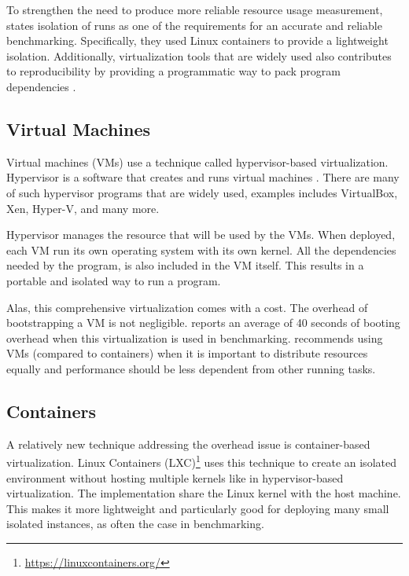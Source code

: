 To strengthen the need to produce more reliable resource usage measurement, \citet{beyerReliableBenchmarkingRequirements2019} states isolation of runs as one of the requirements for an accurate and reliable benchmarking.
Specifically, they used Linux containers to provide a lightweight isolation.
Additionally, virtualization tools that are widely used also contributes to reproducibility by providing a programmatic way to pack program dependencies \citep{boettigerIntroductionDockerReproducible2015,kordonBenchKitToolMassive2014}.

\subsection{Virtual Machines}

Virtual machines (VMs) use a technique called hypervisor-based virtualization.
Hypervisor is a software that creates and runs virtual machines \citep{scheepersVirtualizationContainerizationApplication2014}.
There are many of such hypervisor programs that are widely used, examples includes VirtualBox, Xen, Hyper-V, and many more.

Hypervisor manages the resource that will be used by the VMs.
When deployed, each VM run its own operating system with its own kernel.
All the dependencies needed by the program, is also included in the VM itself.
This results in a portable and isolated way to run a program.

Alas, this comprehensive virtualization comes with a cost.
The overhead of bootstrapping a VM is not negligible.
\citet{kordonBenchKitToolMassive2014} reports an average of 40 seconds of booting overhead when this virtualization is used in benchmarking.
\citet{scheepersVirtualizationContainerizationApplication2014} recommends using VMs (compared to containers) when it is important to distribute resources equally and performance should be less dependent from other running tasks.

\subsection{Containers}

A relatively new technique addressing the overhead issue is container-based virtualization.
Linux Containers (LXC)\footnote{\href{https://linuxcontainers.org/}{https://linuxcontainers.org/}} uses this technique to create an isolated environment without hosting multiple kernels like in hypervisor-based virtualization.
The implementation share the Linux kernel with the host machine.
This makes it more lightweight and particularly good for deploying many small isolated instances, as often the case in benchmarking.

